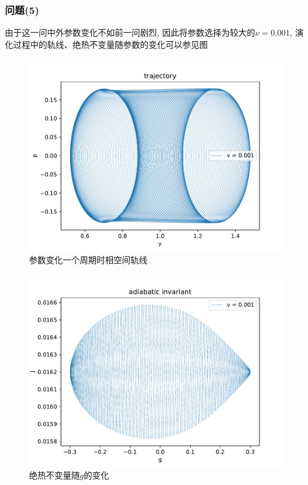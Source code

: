 \documentclass[a4paper,zihao=5,UTF8]{ctexart}
\begin{document}
    \subsubsection{问题(5)}
    由于这一问中外参数变化不如前一问剧烈, 因此将参数选择为较大的$\nu=0.001$, 演化过程中的轨线、绝热不变量随参数的变化可以参见图
    \begin{figure}[htbp]
        \centering
        \includegraphics[scale=0.6]{5_traj_v=0_001.pdf}
        \caption{参数变化一个周期时相空间轨线}
        \label{5 traj}
    \end{figure}
    \begin{figure}[htbp]
        \centering
        \includegraphics[scale=0.6]{5g_ad_invr_v=0_001.pdf}
        \caption{绝热不变量随$g$的变化}
        \label{5 g ad}
    \end{figure}
\end{document}
